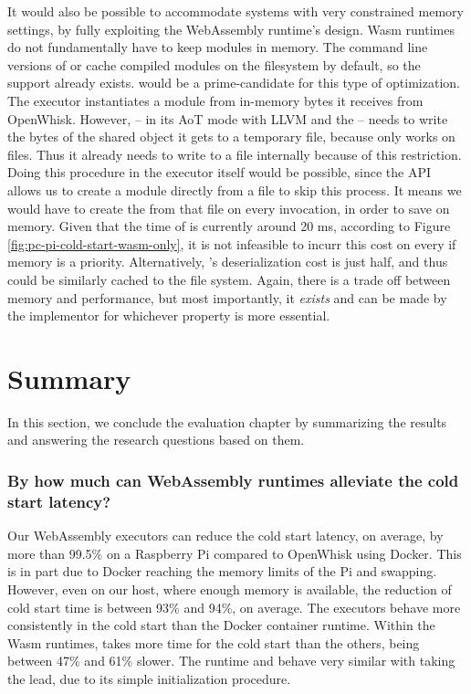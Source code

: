 It would also be possible to accommodate systems with very constrained memory settings, by fully exploiting the WebAssembly runtime's design. Wasm runtimes do not fundamentally have to keep modules in memory. The command line versions of  or  cache compiled modules on the filesystem by default, so the support already exists.  would be a prime-candidate for this type of optimization. The executor instantiates a module from in-memory bytes it receives from OpenWhisk. However,  -- in its AoT mode with LLVM and the  -- needs to write the bytes of the shared object it gets to a temporary file, because  only works on files. Thus it already needs to write to a file internally because of this restriction. Doing this procedure in the executor itself would be possible, since the API allows us to create a module directly from a file to skip this process. It means we would have to create the  from that file on every  invocation, in order to save on memory. Given that the  time of  is currently around 20 ms, according to Figure \ref{fig:pc-pi-cold-start-wasm-only}, it is not infeasible to incurr this cost on every  if memory is a priority. Alternatively, 's deserialization cost is just half, and thus could be similarly cached to the file system. Again, there is a trade off between memory and performance, but most importantly, it \emph{exists} and can be made by the implementor for whichever property is more essential.

\section{Summary}

In this section, we conclude the evaluation chapter by summarizing the results and answering the research questions based on them.

\subsubsection*{By how much can WebAssembly runtimes alleviate the cold start latency?}

Our WebAssembly executors can reduce the cold start latency, on average, by more than 99.5\% on a Raspberry Pi compared to OpenWhisk using Docker. This is in part due to Docker reaching the memory limits of the Pi and swapping. However, even on our  host, where enough memory is available, the reduction of cold start time is between 93\% and 94\%, on average. The executors behave more consistently in the cold start than the Docker container runtime. Within the Wasm runtimes,  takes more time for the cold start than the others, being between 47\% and 61\% slower. The  runtime and  behave very similar with  taking the lead, due to its simple initialization procedure.


